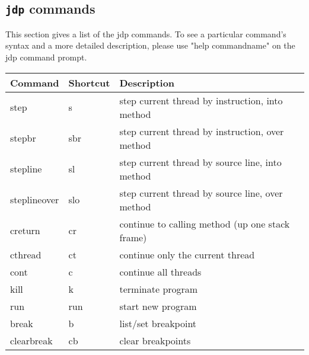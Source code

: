 \AIXTMFooter

\PowerPCTMFooter

\subsection {{\tt jdp} commands}

   This section gives a list of the jdp commands. To see a particular command's
syntax and a more detailed description, please use "help commandname" on the
jdp command prompt.


\begin{tabular}{|l|l|l|} \hline
Command       & Shortcut & Description     \\ \hline
step          & s   & step current thread by instruction, into method           \\ 
stepbr        & sbr & step current thread by instruction, over method           \\ 
stepline      & sl  & step current thread by source line, into method   \\ 
steplineover  & slo & step current thread by source line, over method   \\ 
creturn       & cr  & continue to calling method (up one stack frame)           \\ 
cthread       & ct  & continue only the current thread                  \\ 
cont          & c   & continue all threads                                      \\ 
kill          & k   & terminate program                                         \\ 
run           & run & start new program                                         \\ 
break         & b   & list/set breakpoint                                       \\ 
clearbreak    & cb  & clear breakpoints                                         \\ 


\end{tabular}
